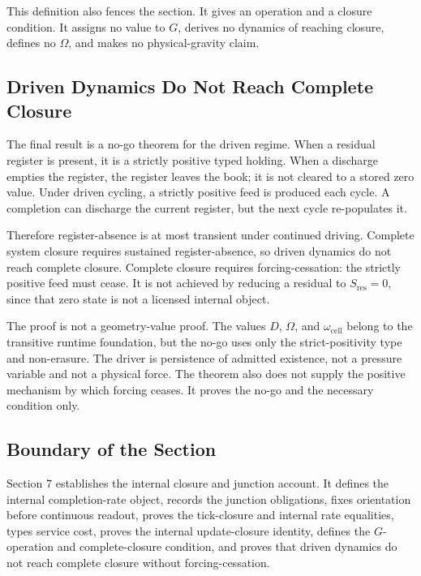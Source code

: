 This definition also fences the section. It gives an operation and a closure condition. It assigns no value to \(G\), derives no dynamics of reaching closure, defines no \(\Omega\), and makes no physical-gravity claim.

\subsection{Driven Dynamics Do Not Reach Complete Closure}
The final result is a no-go theorem for the driven regime. When a residual register is present, it is a strictly positive typed holding. When a discharge empties the register, the register leaves the book; it is not cleared to a stored zero value. Under driven cycling, a strictly positive feed is produced each cycle. A completion can discharge the current register, but the next cycle re-populates it.

Therefore register-absence is at most transient under continued driving. Complete system closure requires sustained register-absence, so driven dynamics do not reach complete closure. Complete closure requires forcing-cessation: the strictly positive feed must cease. It is not achieved by reducing a residual to \(S_{\mathrm{res}}=0\), since that zero state is not a licensed internal object.

The proof is not a geometry-value proof. The values \(D\), \(\Omega\), and \(\omega_{\mathrm{cell}}\) belong to the transitive runtime foundation, but the no-go uses only the strict-positivity type and non-erasure. The driver is persistence of admitted existence, not a pressure variable and not a physical force. The theorem also does not supply the positive mechanism by which forcing ceases. It proves the no-go and the necessary condition only.

\subsection{Boundary of the Section}
Section 7 establishes the internal closure and junction account. It defines the internal completion-rate object, records the junction obligations, fixes orientation before continuous readout, proves the tick-closure and internal rate equalities, types service cost, proves the internal update-closure identity, defines the \(G\)-operation and complete-closure condition, and proves that driven dynamics do not reach complete closure without forcing-cessation.

